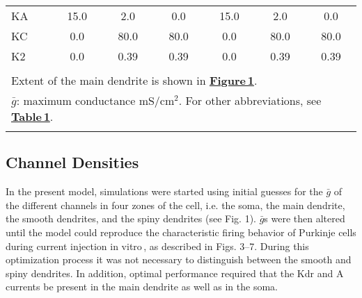\documentclass[12pt]{article}
\begin{document}
\begin{table}[!h]
\begin{tabular}{ l c c c c c c }
KA              &15.0             & 2.0                                     & 0.0                              & 15.0             & 2.0                      & 0.0                                                  \\
KC              & 0.0              & 80.0                                   & 80.0                            & 0.0               & 80.0                    & 80.0                                                \\
K2              & 0.0              & 0.39                                    & 0.39                            & 0.0               & 0.39                   & 0.39                                                \\
                   &                     &                                            &                                      &                     &                             &                                                         \\
\multicolumn{7}{l}{Extent of the main dendrite is shown in \href{../pub-purkinje-deschutter-fig-1/pub-purkinje-deschutter1-fig-1.tex}{\bf Figure\,1}.}                                                                                                                                 \\
\multicolumn{7}{l}{$\bar g$: maximum conductance mS/cm$^2$. For other abbreviations, see \href{../pub-purkinje-deschutter1-table1/pub-purkinje-deschutter1-table1.tex}{\bf Table\,1}.}                                               \\
\multicolumn{7}{l}{}                                                                                                                                                                                                                   \\
\end{tabular}
\end{table}

\subsection*{Channel Densities}

In the present model, simulations were started using initial
guesses for the $\bar g$ of the different channels in four zones of the cell,
i.e. the soma, the main dendrite, the smooth dendrites, and the
spiny dendrites (see Fig. 1). $\bar g$s were then altered until the model
could reproduce the characteristic firing behavior of Purkinje cells
during current injection in vitro\,\cite{R:1980ly, R:1980pi},
as described in Figs. 3--7. During this optimization
process it was not necessary to distinguish between
the smooth and spiny dendrites. In addition, optimal performance
required that the Kdr and A currents be present in the
main dendrite as well as in the soma.
\end{document}
